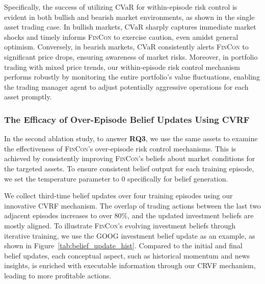 Specifically, the success of utilizing CVaR for within-episode risk control is evident in both bullish and bearish market environments, as shown in the single asset trading case. In bullish markets, CVaR sharply captures immediate market shocks and timely informs \textsc{FinCon} to exercise caution, even amidst general optimism. Conversely, in bearish markets, CVaR consistently alerts \textsc{FinCon} to significant price drops, ensuring awareness of market risks. Moreover, in portfolio trading with mixed price trends, our within-episode risk control mechanism performs robustly by monitoring the entire portfolio's value fluctuations, enabling the trading manager agent to adjust potentially aggressive operations for each asset promptly.

\subsubsection{The Efficacy of Over-Episode Belief Updates Using CVRF}
\label{over-episode-risk-control}
In the second ablation study, to answer \textbf{RQ3}, we use the same assets to examine the effectiveness of \textsc{FinCon}'s over-episode risk control mechanisms. This is achieved by consistently improving \textsc{FinCon}'s beliefs about market conditions for the targeted assets. To ensure consistent belief output for each training episode, we set the temperature parameter to 0 specifically for belief generation.

We collect third-time belief updates over four training episodes using our innovative CVRF mechanism. The overlap of trading actions between the last two adjacent episodes increases to over $80\%$, and the updated investment beliefs are mostly aligned. To illustrate \textsc{FinCon}'s evolving investment beliefs through iterative training, we use the GOOG investment belief update as an example, as shown in Figure~\ref{tab:belief_update_hist}. Compared to the initial and final belief updates, each conceptual aspect, such as historical momentum and news insights, is enriched with executable information through our CRVF mechanism, leading to more profitable actions.

